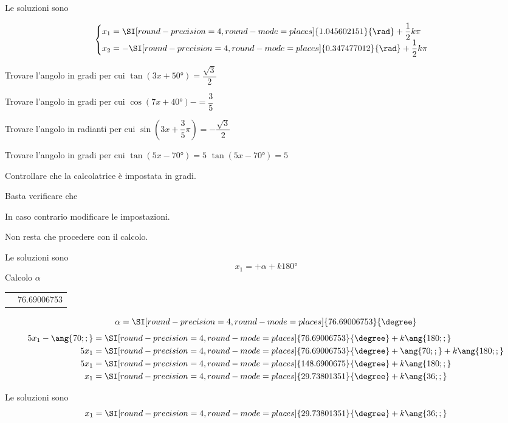 \begin{exercise}
 	Le soluzioni sono
 	
 	\[\begin{cases}
x_1=\SI[round-precision=\lungarrotandamento,round-mode=places]{1.045602151}{\rad}+\dfrac{1}{2}k\pi\\
x_2=-\SI[round-precision=\lungarrotandamento,round-mode=places]{0.347477012}{\rad}+\dfrac{1}{2}k\pi\\
 	\end{cases}\]
 \end{exercise}
 \begin{exercise}[no solution]
 	Trovare l'angolo in gradi per cui $\tan (3x+\ang{50;;})=\dfrac{\sqrt{3}}{2}$
 \end{exercise}
 \begin{exercise}[no solution]
 	Trovare l'angolo in gradi per cui $\cos (7x+\ang{40;;})-=\dfrac{3}{5}$
 \end{exercise}
 \begin{exercise}[no solution]
 	Trovare l'angolo in radianti per cui $\sin (3x+\dfrac{3}{5}\pi)=-\dfrac{\sqrt{3}}{2}$
 \end{exercise}
\begin{exercise}
	Trovare l'angolo in gradi per cui $\tan (5x-\ang{70;;})=5$
	\tcblower
	$\tan (5x-\ang{70;;})=5$
	
	Controllare che la calcolatrice è impostata in gradi.
	
	Basta verificare che 
	\testgradi
	
	In caso contrario modificare le impostazioni.
	
	Non resta che procedere con il calcolo.
	
	Le soluzioni sono 
	\[x_1=+\alpha+k\ang{180;;}\]
	Calcolo $\alpha$
	\begin{center}
		\begin{tabular}{ll}
			\tastoitan\tasto{\num[round-precision=1,round-mode=places]{5}}
			\tastouguale&\num[round-precision=\lungarrotandamento,round-mode=places]{76.69006753} 
		\end{tabular} 
	\end{center}
	\[\alpha=\SI[round-precision=\lungarrotandamento,round-mode=places]{76.69006753}{\degree}\]
	\begin{align*}
	5x_1-\ang{70;;}&=\SI[round-precision=\lungarrotandamento,round-mode=places]{76.69006753}{\degree}+k\ang{180;;}\\
	5x_1&=\SI[round-precision=\lungarrotandamento,round-mode=places]{76.69006753}{\degree}+\ang{70;;}+k\ang{180;;}\\
	5x_1&=\SI[round-precision=\lungarrotandamento,round-mode=places]{148.6900675}{\degree}+k\ang{180;;}\\
	x_1&=\SI[round-precision=\lungarrotandamento,round-mode=places]{29.73801351}{\degree}+k\ang{36;;}
	\end{align*}
	
	Le soluzioni sono
	\[x_1=\SI[round-precision=\lungarrotandamento,round-mode=places]{29.73801351}{\degree}+k\ang{36;;}\]
\end{exercise}
